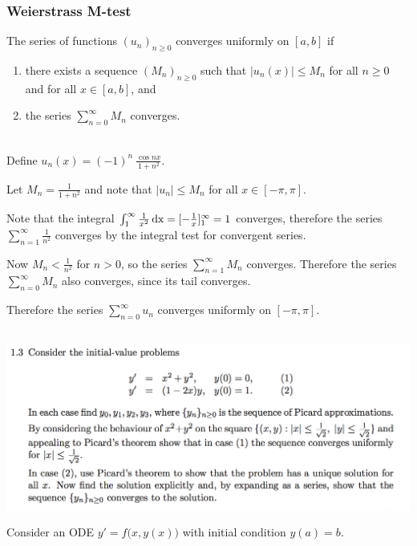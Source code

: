 \documentclass[12pt]{article}
\begin{document}
\subsubsection*{Weierstrass M-test}
The series of functions $(u_n)_{n\geq 0}$ converges uniformly on $[a,b]$ if
\begin{enumerate}
\item there exists a sequence $(M_n)_{n\geq 0}$ such that $|u_n(x)| \leq M_n$
  for all $n \geq 0$ and for all $x \in [a,b]$, and
\item the series $\sum_{n=0}^\infty M_n$ converges.
\end{enumerate}
~\\
Define $u_n(x) = (-1)^n ~ \frac{\cos nx}{1 + n^2}$.

Let $M_n = \frac{1}{1 + n^2}$ and note that $|u_n| \leq M_n$ for all
$x \in [-\pi,\pi]$.

Note that the integral
$\int_1^\infty \frac{1}{x^2} \operatorname{\text{dx}} = [-\frac{1}{x}]_1^\infty = 1$ converges,
therefore the series $\sum_{n=1}^\infty \frac{1}{n^2}$ converges by the
integral test for convergent series.

Now $M_n < \frac{1}{n^2}$ for $n > 0$, so the series $\sum_{n=1}^\infty M_n$
converges. Therefore the series $\sum_{n=0}^\infty M_n$ also converges, since
its tail converges.

Therefore the series $\sum_{n=0}^\infty u_n$ converges uniformly on
$[-\pi,\pi]$.

\newpage
\subsection*{}  %
\begin{mdframed}
\includegraphics[width=400pt]{img/differential-equations-a1-1-3.png}\\
\end{mdframed}

Consider an ODE $y' = f\Big(x, y(x)\Big)$ with initial condition $y(a) = b$.
\end{document}
